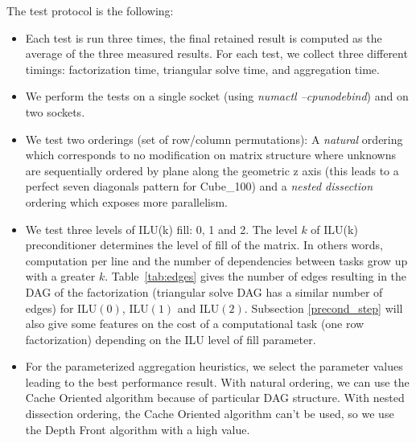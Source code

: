 The test protocol is the following:
\begin{itemize}
\item Each test is run three times, the final retained result is
  computed as the average of the three measured results. For each
  test, we collect three different timings:
  factorization time, triangular solve time, and aggregation time.

\item We perform the tests on a single socket (using
      {\em numactl --cpunodebind}) and on two sockets.


\item We test two orderings (set of row/column permutations): A {\em natural} ordering which corresponds to no
      modification on matrix structure where unknowns are sequentially
      ordered by plane along the geometric z axis
      (this leads to a perfect seven diagonals pattern for Cube\_100)
      and a {\em nested dissection}~\cite{Saad96IMSLS} ordering which exposes more parallelism.


\item We test three levels of ILU(k) fill: 0, 1 and 2.
      The level $k$ of ILU(k) preconditioner determines the level of fill of
      the matrix. In others words, computation per line and the number of dependencies
      between tasks grow up with a greater $k$. Table~\ref{tab:edges} gives the number of edges resulting in the DAG of the factorization
      (triangular solve DAG has a similar number of edges) for ILU$(0)$, ILU$(1)$ and ILU$(2)$. Subsection \ref{precond_step} will also give some features on the cost of a computational task (one row factorization)
      depending on the ILU level of fill parameter.

\item For the parameterized aggregation heuristics, we select the
      parameter values leading to the best performance result. With
      natural ordering, we can use the Cache Oriented algorithm because of
      particular DAG structure. With nested dissection ordering, the Cache Oriented algorithm
      can't be used, so we use the Depth Front algorithm with a high value.
\end{itemize}



